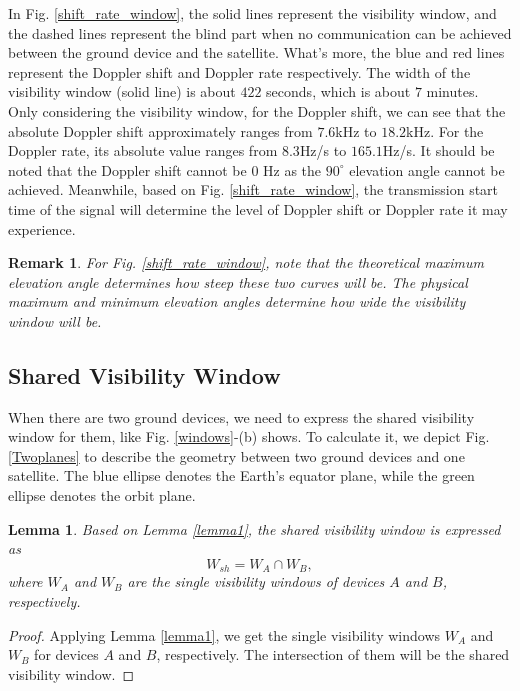 \documentclass{IEEEtaes}
\theoremstyle{plain}
\newtheorem{remark}{Remark}
\newtheorem{lemma}{Lemma}
\begin{document}
In Fig. \ref{shift_rate_window}, the solid lines represent the visibility window, and the dashed lines represent the blind part when no communication can be achieved between the ground device and the satellite. What's more, the blue and red lines represent the Doppler shift and Doppler rate respectively. The width of the visibility window (solid line) is about $422$ seconds, which is about $7$ minutes. Only considering the visibility window, for the Doppler shift, we can see that the absolute Doppler shift approximately ranges from $7.6$kHz to $18.2$kHz. For the Doppler rate, its absolute value ranges from $8.3$Hz/s to $165.1$Hz/s. It should be noted that the Doppler shift cannot be $0$ Hz as the $90^{\circ}$ elevation angle cannot be achieved. Meanwhile, based on Fig. \ref{shift_rate_window}, the transmission start time of the signal will determine the level of Doppler shift or Doppler rate it may experience.


\begin{remark} For Fig. \ref{shift_rate_window}, note that the theoretical maximum elevation angle determines how steep these two curves will be. The physical maximum and minimum elevation angles determine how wide the visibility window will be.
\end{remark}

\subsection{Shared Visibility Window}
When there are two ground devices, we need to express the shared visibility window for them, like Fig. \ref{windows}-(b) shows. To calculate it, we depict Fig. \ref{Twoplanes} to describe the geometry between two ground devices and one satellite. The blue ellipse denotes the Earth's equator plane, while the green ellipse denotes the orbit plane.
\begin{lemma}\label{lemma2}
Based on Lemma \ref{lemma1}, the shared visibility window is expressed as 
\begin{equation}
    \label{shared_window}
    W_{sh} = W_A \cap W_B,
\end{equation}
where $W_A$ and $W_B$ are the single visibility windows of devices $A$ and $B$, respectively.
\end{lemma}
\begin{proof}
    Applying Lemma \ref{lemma1}, we get the single visibility windows $W_A$ and $W_B$ for devices $A$ and $B$, respectively. The intersection of them will be the shared visibility window.
\end{proof}
\end{document}
